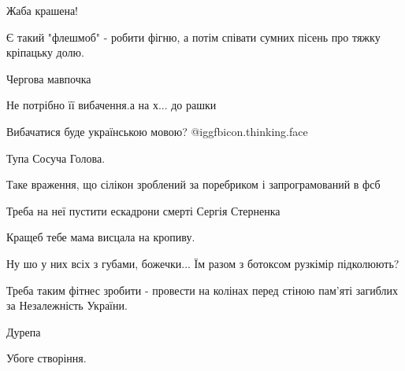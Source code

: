 \begin{itemize}
Жаба крашена!

Є такий "флешмоб" - робити фігню, а потім співати сумних пісень про тяжку кріпацьку долю.


Чергова мавпочка

Не потрібно її вибачення.а на х... до рашки

Вибачатися буде українською мовою? @igg{fbicon.thinking.face} 

Тупа Сосуча Голова.

Таке враження, що сілікон зроблений за поребриком і запрограмований в фсб

Треба на неї пустити ескадрони смерті Сергія Стерненка

Кращеб тебе мама висцала на кропиву.

Ну шо у них всіх з губами, божечки... Їм разом з ботоксом рузкімір підколюють?

Треба таким фітнес зробити - провести на колінах перед стіною пам'яті загиблих за Незалежність України.

Дурепа

Убоге створіння.

\end{itemize} %
